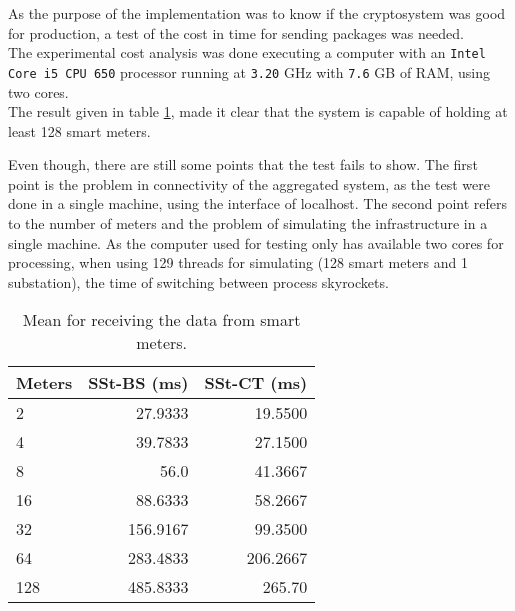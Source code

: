 
  
  As the purpose of the implementation was to know if the cryptosystem was
   good for production, a test of the cost in time for sending packages was
   needed. \\
   
   The experimental cost analysis was done executing a computer with an \texttt{Intel Core i5 CPU 650} processor running at \texttt{3.20} GHz with \texttt{7.6} GB of RAM, using two cores.\\
   
   The result given in table \ref{ana:tab1}, made it clear that
   the system is capable of holding at least 128 smart meters. 
   
   Even though,
   there are still some points that the test fails to show. The first point is the problem in connectivity of the aggregated system, as the test were done in a single machine, using the interface of localhost.
   The second point refers to the number of meters and the problem of simulating the infrastructure in a single machine. As the computer used for testing only has available two cores for processing, when using 129 threads for simulating (128 smart meters and 1 substation), the time of switching between process skyrockets.
   
   \begin{table}
   		\centering
   		\begin{tabular}{l|rr}
   			Meters & SSt-BS (ms) & SSt-CT (ms) \\ \hline
   			2      &     27.9333 &     19.5500 \\
   			4      &     39.7833 &     27.1500 \\
   			8      &        56.0 &     41.3667 \\
   			16     &     88.6333 &     58.2667 \\
   			32     &    156.9167 &     99.3500 \\
   			64     &    283.4833 &    206.2667 \\
   			128    &    485.8333 &      265.70
   		\end{tabular}
   		\caption{Mean for receiving the data from smart meters.}
   		\label{ana:tab1}
   \end{table}

